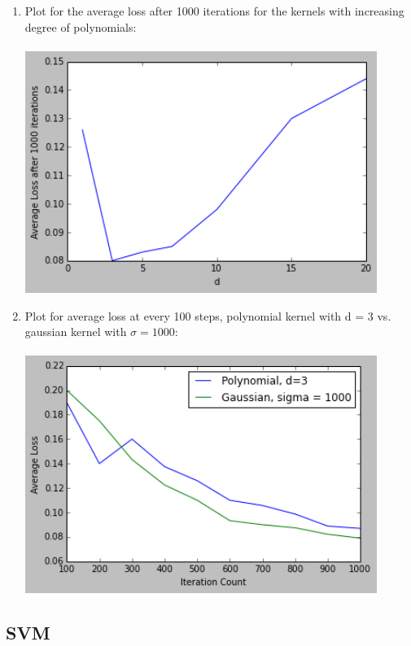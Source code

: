 \documentclass[letterpaper]{article}
\begin{document}
\begin{enumerate}
\item Plot for the average loss after 1000 iterations for the kernels with increasing degree of polynomials:\\ \\ 
\includegraphics[width = 4.5in, keepaspectratio]{HW3_figure4.png}

\item Plot for average loss at every 100 steps, polynomial kernel with d = 3 vs. gaussian kernel with $\sigma = 1000$:\\  \\
\includegraphics[width = 4.5in, keepaspectratio]{HW3_figure5.png}

\end{enumerate}

\subsection{SVM}
 
\end{document}
